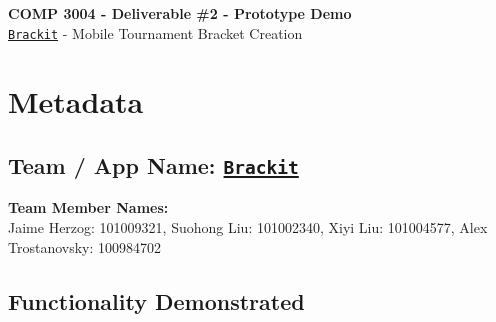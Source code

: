 \documentclass{article}
\begin{document}
\begin{center}


    \LARGE{\textbf{COMP 3004 - Deliverable \#2 - Prototype Demo}}\\ 
    \Large{\href{https://github.com/alextrosta/brackit}{\texttt{Brackit}} - Mobile Tournament Bracket Creation} 
\end{center}


\section*{Metadata}
\subsection*{Team / App Name: \href{https://github.com/alextrosta/brackit}{\texttt{Brackit}}}
\textbf{Team Member Names:}\\ Jaime Herzog: 101009321, Suohong Liu: 101002340, Xiyi Liu: 101004577, Alex Trostanovsky: 100984702

\subsection*{Functionality Demonstrated}
\end{document}
